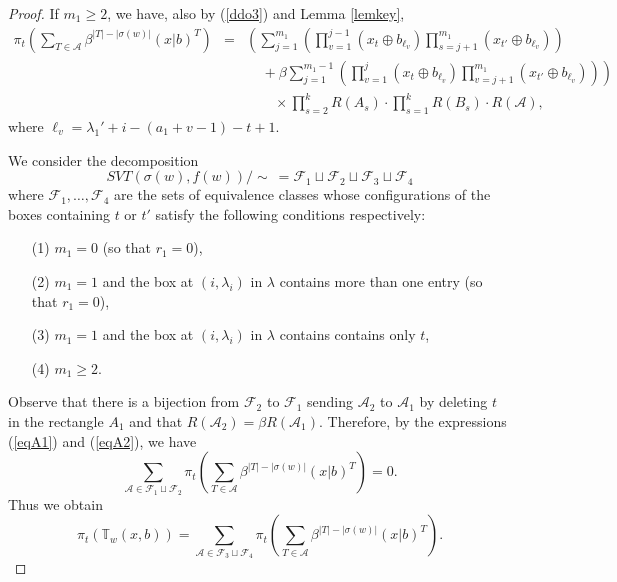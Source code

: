 \documentclass[11pt,reqno,sumlimits]{amsart}
\newcommand{\bbT}{{\mathbb T}}
\newcommand{\calF}{{\mathcal F}}
\newcommand{\scA}{{\mathscr A}}
\newcommand{\FSVT}{{SVT}}
\theoremstyle{definition}
\numberwithin{equation}{section}
\begin{document}
\begin{proof}
If $m_1\geq 2$, we have, also by (\ref{ddo3}) and Lemma \ref{lemkey}, 
\begin{eqnarray}\label{eqA3}
\pi_t\left(\sum_{T\in \scA}\beta^{|T|-|\sigma(w)|}(x|b)^T\right)
&=&\left(\sum_{j=1}^{m_1} \left(\prod_{v=1}^{j-1} (x_t \oplus b_{\ell_v}) \prod_{s=j+1}^{m_1} (x_{t'} \oplus b_{\ell_v})\right)\right.\nonumber\\
&&\ \ \ \ \  + \beta \left.\sum_{j=1}^{m_1-1} \left(\prod_{v=1}^{j} (x_t \oplus b_{\ell_v}) \prod_{v=j+1}^{m_1} (x_{t'} \oplus b_{\ell_v})\right)\right)\nonumber\\
&&\ \ \ \ \ \ \ \ \  \times \prod_{s=2}^k R(A_s) \cdot \prod_{s=1}^k R(B_s) \cdot R(\scA),
\end{eqnarray}
where $\ell_v={\lambda_1' + i - (a_1+v-1) - t +1}$.

%




We consider the decomposition
\[
\FSVT(\sigma(w),f(w))/\!\!\sim \ = \calF_1 \sqcup \calF_2\sqcup \calF_3\sqcup \calF_4
\]
where $\calF_1,\dots, \calF_4$ are the sets of equivalence classes whose configurations of the boxes containing $t$ or $t'$ satisfy the following conditions respectively:
\begin{itemize}
\item[(1)] $m_1=0$ (so that $r_1=0$),
\item[(2)] $m_1=1$ and the box at $(i,\lambda_i)$ in $\lambda$ contains more than one entry (so that $r_1=0$),
\item[(3)] $m_1=1$ and the box at $(i,\lambda_i)$ in $\lambda$ contains contains only $t$,
\item[(4)] $m_1\geq 2$.
\end{itemize}
Observe that there is a bijection from $\calF_2$ to $\calF_1$ sending $\scA_2$ to $\scA_1$ by deleting $t$ in the rectangle $A_1$ and that $R(\scA_2) = \beta R(\scA_1)$. Therefore,  by the expressions (\ref{eqA1}) and (\ref{eqA2}), we have
\[
\sum_{\scA \in \calF_1\sqcup \calF_2}\pi_t\left(\sum_{T \in \scA}  \beta^{|T| - |\sigma(w)|}(x|b)^T\right) = 0.
\]
Thus we obtain
\[
\pi_t(\bbT_w(x,b)) = \sum_{\scA\in \calF_3 \sqcup\calF_4} \pi_t\left(\sum_{T\in \scA} \beta^{|T|-|\sigma(w)|}(x|b)^T\right).
\]


\end{proof}
\end{document}
